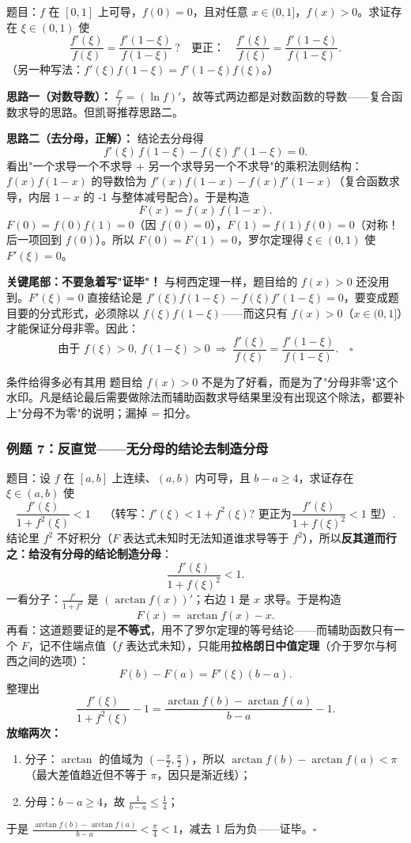 \documentclass[a4paper]{article}
\begin{document}
题目：$f$ 在 $[0,1]$ 上可导，$f(0)=0$，且对任意 $x\in(0,1]$，$f(x)>0$。求证存在 $\xi\in(0,1)$ 使
\[
\frac{f'(\xi)}{f(\xi)}=\frac{f'(1-\xi)}{f(1-\xi)}\ ?\quad\text{更正：}\quad \frac{f'(\xi)}{f(\xi)}=\frac{f'(1-\xi)}{f(1-\xi)}.
\]
（另一种写法：$f'(\xi)f(1-\xi)=f'(1-\xi)f(\xi)$。）

\textbf{思路一（对数导数）：} $\frac{f'}{f}=(\ln f)'$，故等式两边都是对数函数的导数——复合函数求导的思路。但凯哥推荐思路二。

\textbf{思路二（去分母，正解）：} 结论去分母得
\[
f'(\xi)\,f(1-\xi)-f(\xi)\,f'(1-\xi)=0 .
\]
看出"一个求导一个不求导 + 另一个求导另一个不求导"的乘积法则结构：$f(x)f(1-x)$ 的导数恰为 $f'(x)f(1-x)-f(x)f'(1-x)$（复合函数求导，内层 $1-x$ 的 -1 与整体减号配合）。于是构造
\[
F(x)=f(x)\,f(1-x).
\]
$F(0)=f(0)f(1)=0$（因 $f(0)=0$），$F(1)=f(1)f(0)=0$（对称！后一项回到 $f(0)$）。所以 $F(0)=F(1)=0$，罗尔定理得 $\xi\in(0,1)$ 使 $F'(\xi)=0$。

\textbf{关键尾部：不要急着写"证毕"！} 与柯西定理一样，题目给的 $f(x)>0$ 还没用到。$F'(\xi)=0$ 直接结论是 $f'(\xi)f(1-\xi)-f(\xi)f'(1-\xi)=0$，要变成题目要的分式形式，必须除以 $f(\xi)f(1-\xi)$——而这只有 $f(x)>0$（$x\in(0,1]$）才能保证分母非零。因此：
\[
\text{由于 }f(\xi)>0,\ f(1-\xi)>0\ \Rightarrow\ \frac{f'(\xi)}{f(\xi)}=\frac{f'(1-\xi)}{f(1-\xi)}.\quad\square
\]

\begin{warningbox}{条件给得多必有其用}
题目给 $f(x)>0$ 不是为了好看，而是为了"分母非零"这个水印。凡是结论最后需要做除法而辅助函数求导结果里没有出现这个除法，都要补上"分母不为零"的说明；漏掉 = 扣分。
\end{warningbox}

\subsubsection{例题 7：反直觉——无分母的结论去制造分母}

题目：设 $f$ 在 $[a,b]$ 上连续、$(a,b)$ 内可导，且 $b-a\ge 4$，求证存在 $\xi\in(a,b)$ 使
\[
\frac{f'(\xi)}{1+f^2(\xi)} < 1\ \quad\text{（转写：$f'(\xi)<1+f^2(\xi)$? 更正为} \frac{f'(\xi)}{1+f(\xi)^2}<1\text{ 型）}.
\]
结论里 $f^2$ 不好积分（$F$ 表达式未知时无法知道谁求导等于 $f^2$），所以\textbf{反其道而行之：给没有分母的结论制造分母}：
\[
\frac{f'(\xi)}{1+f(\xi)^2}<1 .
\]
一看分子：$\frac{f'}{1+f^2}$ 是 $(\arctan f(x))'$；右边 $1$ 是 $x$ 求导。于是构造
\[
F(x)=\arctan f(x)-x .
\]
再看：这道题要证的是\textbf{不等式}，用不了罗尔定理的等号结论——而辅助函数只有一个 $F$，记不住端点值（$f$ 表达式未知），只能用\textbf{拉格朗日中值定理}（介于罗尔与柯西之间的选项）：
\[
F(b)-F(a)=F'(\xi)(b-a).
\]
整理出
\[
\frac{f'(\xi)}{1+f^2(\xi)}-1=\frac{\arctan f(b)-\arctan f(a)}{b-a}-1 .
\]
\textbf{放缩两次：}
\begin{enumerate}
\item 分子：$\arctan$ 的值域为 $(-\frac{\pi}{2},\frac{\pi}{2})$，所以 $\arctan f(b)-\arctan f(a)<\pi$（最大差值趋近但不等于 $\pi$，因只是渐近线）；
\item 分母：$b-a\ge 4$，故 $\frac{1}{b-a}\le \frac14$；
\end{enumerate}
于是 $\frac{\arctan f(b)-\arctan f(a)}{b-a}<\frac{\pi}{4}<1$，减去 1 后为负——证毕。$\square$
\end{document}
